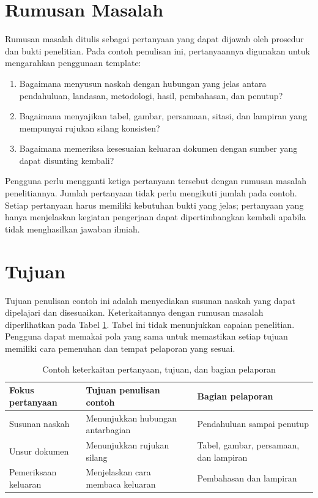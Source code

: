 \section{Rumusan Masalah}

Rumusan masalah ditulis sebagai pertanyaan yang dapat dijawab oleh prosedur dan bukti penelitian. Pada contoh penulisan ini, pertanyaannya digunakan untuk mengarahkan penggunaan template:

\begin{enumerate}
  \item Bagaimana menyusun naskah dengan hubungan yang jelas antara pendahuluan, landasan, metodologi, hasil, pembahasan, dan penutup?
  \item Bagaimana menyajikan tabel, gambar, persamaan, sitasi, dan lampiran yang mempunyai rujukan silang konsisten?
  \item Bagaimana memeriksa kesesuaian keluaran dokumen dengan sumber yang dapat disunting kembali?
\end{enumerate}

Pengguna perlu mengganti ketiga pertanyaan tersebut dengan rumusan masalah penelitiannya. Jumlah pertanyaan tidak perlu mengikuti jumlah pada contoh. Setiap pertanyaan harus memiliki kebutuhan bukti yang jelas; pertanyaan yang hanya menjelaskan kegiatan pengerjaan dapat dipertimbangkan kembali apabila tidak menghasilkan jawaban ilmiah.

\section{Tujuan}

Tujuan penulisan contoh ini adalah menyediakan susunan naskah yang dapat dipelajari dan disesuaikan. Keterkaitannya dengan rumusan masalah diperlihatkan pada Tabel \ref{tab:contoh-keterkaitan}. Tabel ini tidak menunjukkan capaian penelitian. Pengguna dapat memakai pola yang sama untuk memastikan setiap tujuan memiliki cara pemenuhan dan tempat pelaporan yang sesuai.

\begin{table}[htbp]
  \centering
  \caption{Contoh keterkaitan pertanyaan, tujuan, dan bagian pelaporan}
  \label{tab:contoh-keterkaitan}
  \begin{tabular}{p{3.6cm}p{4.2cm}p{4.4cm}}
    \toprule
    Fokus pertanyaan & Tujuan penulisan contoh & Bagian pelaporan \\
    \midrule
    Susunan naskah & Menunjukkan hubungan antarbagian & Pendahuluan sampai penutup \\
    Unsur dokumen & Menunjukkan rujukan silang & Tabel, gambar, persamaan, dan lampiran \\
    Pemeriksaan keluaran & Menjelaskan cara membaca keluaran & Pembahasan dan lampiran \\
    \bottomrule
  \end{tabular}
\end{table}

